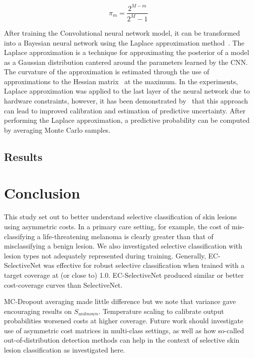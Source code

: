 \begin{equation}
	\pi_m = \frac{2^{M-m}}{2^M-1}
	\label{eq:elbo_weighting}
\end{equation}

After training the Convolutional neural network model, it can be transformed into a Bayesian neural network using the Laplace approximation method~\citep{mackay1992bayesian}. The Laplace approximation is a technique for approximating the posterior of a model as a Gaussian distribution cantered around the parameters learned by the CNN. The curvature of the approximation is estimated through the use of approximations to the Hessian matrix~\citep{botev2017practical} at the maximum. In the experiments, Laplace approximation was applied to the last layer of the neural network due to hardware constraints, however, it has been demonstrated by~\cite{kristiadi2020being} that this approach can lead to improved calibration and estimation of predictive uncertainty. After performing the Laplace approximation, a predictive probability can be computed by averaging Monte Carlo samples.


\subsection{Results}



\section{Conclusion}
\label{sec:selective_conclusion}
This study set out to better understand selective classification of skin lesions using asymmetric costs. In a primary care setting, for example, the cost of mis-classifying a life-threatening melanoma is clearly greater than that of misclassifying a benign lesion. We also investigated selective classification with lesion types not adequately represented during training. Generally, EC-SelectiveNet was effective for robust selective classification when trained with a target coverage at (or close to) 1.0. EC-SelectiveNet produced similar or better cost-coverage curves than SelectiveNet.

MC-Dropout averaging made little difference but we note that variance gave encouraging results on \(S_{unknown}\). Temperature scaling to calibrate output probabilities worsened costs at higher coverage. Future work should investigate use of asymmetric cost matrices in multi-class settings, as well as how so-called out-of-distribution detection methods can help in the context of selective skin lesion classification as investigated here.